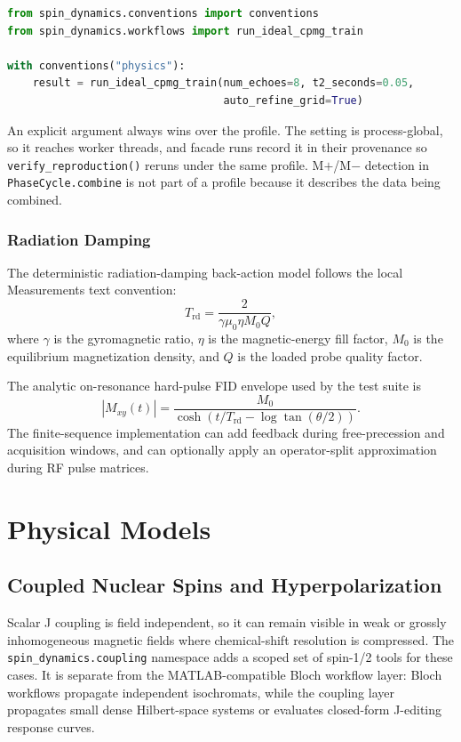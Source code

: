 \documentclass[11pt,oneside]{report}
\newcommand{\code}[1]{\texttt{#1}}
\begin{document}
\begin{lstlisting}[language=Python]
from spin_dynamics.conventions import conventions
from spin_dynamics.workflows import run_ideal_cpmg_train

with conventions("physics"):
    result = run_ideal_cpmg_train(num_echoes=8, t2_seconds=0.05,
                                  auto_refine_grid=True)
\end{lstlisting}

An explicit argument always wins over the profile. The setting is
process-global, so it reaches worker threads, and facade runs record it in
their provenance so \code{verify\_reproduction()} reruns under the same
profile. M$+$/M$-$ detection in \code{PhaseCycle.combine} is not part of a
profile because it describes the data being combined.

\section{Radiation Damping}

The deterministic radiation-damping back-action model follows the local
Measurements text convention:
\[
  T_{\mathrm{rd}} =
    \frac{2}{\gamma \mu_0 \eta M_0 Q},
\]
where \(\gamma\) is the gyromagnetic ratio, \(\eta\) is the magnetic-energy fill
factor, \(M_0\) is the equilibrium magnetization density, and \(Q\) is the
loaded probe quality factor.

The analytic on-resonance hard-pulse FID envelope used by the test suite is
\[
  |M_{xy}(t)| =
    \frac{M_0}
    {\cosh\left(t/T_{\mathrm{rd}} - \log \tan(\theta/2)\right)}.
\]
The finite-sequence implementation can add feedback during free-precession and
acquisition windows, and can optionally apply an operator-split approximation
during RF pulse matrices.

\part{Physical Models}
\label{part:physics-models}

\chapter{Coupled Nuclear Spins and Hyperpolarization}
\label{chap:jcoupling}

Scalar J coupling is field independent, so it can remain visible in weak or
grossly inhomogeneous magnetic fields where chemical-shift resolution is
compressed. The \code{spin\_dynamics.coupling} namespace adds a scoped set of
spin-1/2 tools for these cases. It is separate from the MATLAB-compatible Bloch
workflow layer: Bloch workflows propagate independent isochromats, while the
coupling layer propagates small dense Hilbert-space systems or evaluates
closed-form J-editing response curves.
\end{document}
